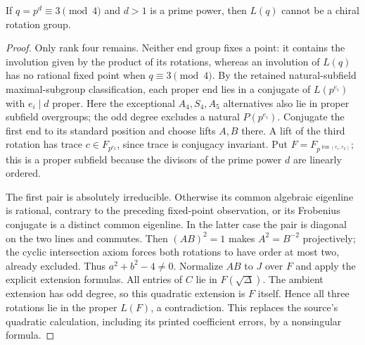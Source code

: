 \begin{lemma}\label{E.OddDegreeExclusion}
If $q=p^d\equiv3\pmod4$ and $d>1$ is a prime power, then $L(q)$
cannot be a chiral rotation group.
\end{lemma}
\begin{proof}
Only rank four remains. Neither end group fixes a point: it contains the
involution given by the product of its rotations, whereas an involution
of $L(q)$ has no rational fixed point when $q\equiv3\pmod4$.
By the retained natural-subfield maximal-subgroup classification, each
proper end lies in a conjugate of $L(p^{e_i})$ with $e_i\mid d$ proper.
Here the exceptional $A_4,S_4,A_5$ alternatives also lie in proper
subfield overgroups; the odd degree excludes a natural $P(p^{e_i})$.
Conjugate the first end to its standard position and choose lifts $A,B$
there. A lift of the third rotation has trace $c\in F_{p^{e_2}}$, since
trace is conjugacy invariant. Put $F=F_{p^{\operatorname{lcm}(e_1,e_2)}}$;
this is a proper subfield because the divisors of the prime power $d$
are linearly ordered.

The first pair is absolutely irreducible. Otherwise its common
algebraic eigenline is rational, contrary to the preceding fixed-point
observation, or its Frobenius conjugate is a distinct common eigenline.
In the latter case the pair is diagonal on the two lines and commutes.
Then $(AB)^2=1$ makes $A^2=B^{-2}$ projectively; the cyclic intersection
axiom forces both rotations to have order at most two, already excluded.
Thus $a^2+b^2-4\ne0$. Normalize $AB$ to $J$ over $F$ and apply the
explicit extension formulas. All entries of $C$ lie in $F(\sqrt\Delta)$.
The ambient extension has odd degree, so this quadratic extension is
$F$ itself. Hence all three rotations lie in the proper $L(F)$,
a contradiction. This replaces the source's quadratic calculation,
including its printed coefficient errors, by a nonsingular formula.
\end{proof}
